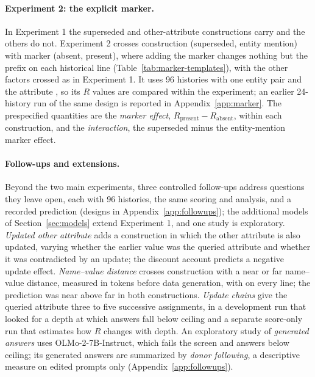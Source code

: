 \paragraph{Experiment 2: the explicit marker.} In Experiment 1 the superseded and other-attribute constructions carry  and the others do not. Experiment 2 crosses construction (superseded, entity mention) with marker (absent, present), where adding the marker changes nothing but the prefix  on each historical line (Table~\ref{tab:marker-templates}), with the other factors crossed as in Experiment 1. It uses 96 histories with one entity pair and the attribute , so its $R$ values are compared within the experiment; an earlier 24-history run of the same design is reported in Appendix~\ref{app:marker}. The prespecified quantities are the \emph{marker effect}, $R_{\text{present}}-R_{\text{absent}}$, within each construction, and the \emph{interaction}, the superseded minus the entity-mention marker effect.

\paragraph{Follow-ups and extensions.} Beyond the two main experiments, three controlled follow-ups address questions they leave open, each with 96 histories, the same scoring and analysis, and a recorded prediction (designs in Appendix~\ref{app:followups}); the additional models of Section~\ref{sec:models} extend Experiment 1, and one study is exploratory. \emph{Updated other attribute} adds a construction in which the other attribute is also updated, varying whether the earlier value was the queried attribute and whether it was contradicted by an update; the discount account predicts a negative update effect. \emph{Name--value distance} crosses construction with a near or far name--value distance, measured in tokens before data generation, with  on every line; the prediction was near above far in both constructions. \emph{Update chains} give the queried attribute three to five successive assignments, in a development run that looked for a depth at which answers fall below ceiling and a separate score-only run that estimates how $R$ changes with depth. An exploratory study of \emph{generated answers} uses OLMo-2-7B-Instruct, which fails the screen and answers below ceiling; its generated answers are summarized by \emph{donor following}, a descriptive measure on edited prompts only (Appendix~\ref{app:followups}).
